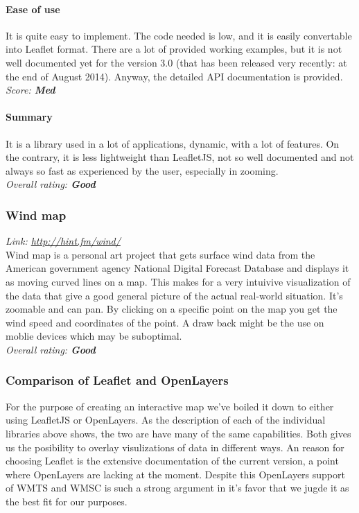 \documentclass[11pt,a4paper,titlepage,oneside]{report}
\begin{document}
   \paragraph{Ease of use}
   It is quite easy to implement. The code needed is low, and it is easily convertable into Leaflet format. There are a lot of provided working examples, but it is not well documented yet for the version 3.0 (that has been released very recently: at the end of August 2014). Anyway, the detailed API documentation is provided.
   \\ \emph{Score: \textbf{Med}}
   \paragraph{Summary}
   It is a library used in a lot of applications, dynamic, with a lot of features. On the contrary, it is less lightweight than LeafletJS, not so well documented and not always so fast as experienced by the user, especially in zooming.
   \\ \emph{Overall rating: \textbf{Good}}
  
  \subsubsection{Wind map}
  \emph{Link: \url{http://hint.fm/wind/}} \\%
    Wind map is a personal art project that gets surface wind data from the American government agency National Digital Forecast Database and displays it as moving curved lines on a map. This makes for a very intuivive visualization of the data that give a good general picture of the actual real-world situation. It's zoomable and can pan. By clicking on a specific point on the map you get the wind speed and coordinates of the point. A draw back might be the use on moblie devices which may be suboptimal.
  \\ \emph{Overall rating: \textbf{Good}}

  \subsubsection{Comparison of Leaflet and OpenLayers}
    For the purpose of creating an interactive map we've boiled it down to either using LeafletJS or OpenLayers. As the description of each of the individual libraries above shows, the two are have many of the same capabilities. Both gives us the posibility to overlay visulizations of data in different ways. An reason for choosing Leaflet is the extensive documentation of the current version, a point where OpenLayers are lacking at the moment. Despite this OpenLayers support of WMTS and WMSC is such a strong argument in it's favor that we jugde it as the best fit for our purposes.
    
\end{document}
